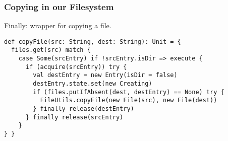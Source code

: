 \documentclass[aspectratio=169]{beamer}
\begin{document}
\begin{frame}[fragile]\frametitle{Copying in our Filesystem}
    Finally: wrapper for copying a file.

\begin{lstlisting}[emph={execute,sleep,log,Copying,copyFile,acquire, release}]
def copyFile(src: String, dest: String): Unit = {
  files.get(src) match {
    case Some(srcEntry) if !srcEntry.isDir => execute {
      if (acquire(srcEntry)) try {
        val destEntry = new Entry(isDir = false)
        destEntry.state.set(new Creating)
        if (files.putIfAbsent(dest, destEntry) == None) try {
          FileUtils.copyFile(new File(src), new File(dest))
        } finally release(destEntry)
      } finally release(srcEntry)
    }
} }
\end{lstlisting}
\end{frame}



\end{document}
